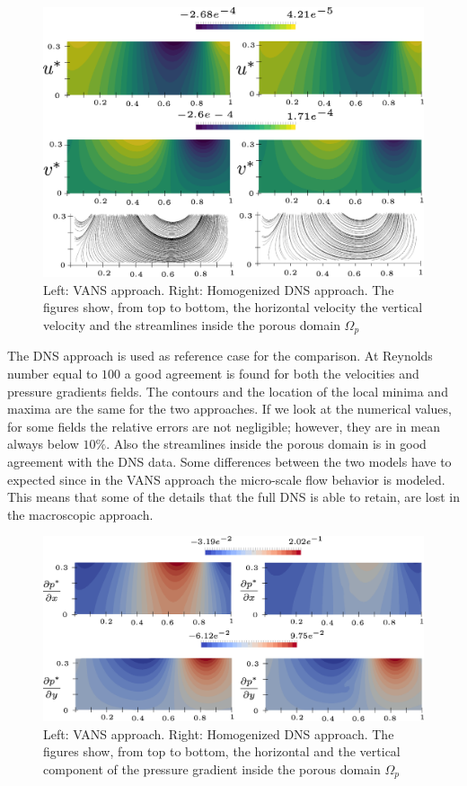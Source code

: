 \begin{figure}[H]
	\centering
	\includegraphics[width=1\linewidth]{chapter_5/figure/re100/vans_u}
	\caption{Left: VANS approach. Right: Homogenized DNS approach. The figures show, from top to bottom, the horizontal velocity the vertical velocity and the streamlines inside the porous domain $\Omega_p$}
	\label{fig:100_u}
\end{figure}

The DNS approach is used as reference case for the comparison. At Reynolds number equal to $100$ a good agreement is found for both the velocities and pressure gradients fields. The contours and the location of the local minima and maxima are the same for the two approaches. If we look at the numerical values, for some fields the relative errors are not negligible; however, they are in mean always below $10\%$. Also the streamlines inside the porous domain is in good agreement with the DNS data.
Some differences between the two models have to expected since in the VANS approach the micro-scale flow behavior is modeled. This means that some of the details that the full DNS is able to retain, are lost in the macroscopic approach. 

\begin{figure}[H]
	\centering
	\includegraphics[width=1\linewidth]{chapter_5/figure/re100/vans_p}
	\caption{Left: VANS approach. Right: Homogenized DNS approach. The figures show, from top to bottom, the horizontal and the vertical component of the pressure gradient inside the porous domain $\Omega_p$}
	\label{fig:100_p}
\end{figure}


